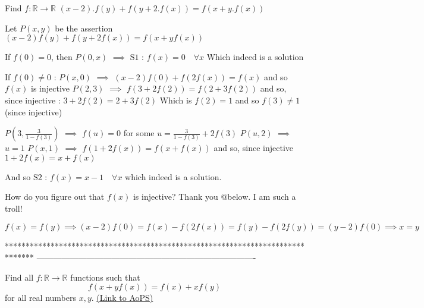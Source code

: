 \begin{solution}
	\begin{tcolorbox}Find $f:\mathbb{R}\to \mathbb{R}$
 $(x-2).f(y)+f(y+2.f(x))=f(x+y.f(x))$\end{tcolorbox}
Let $P(x,y)$ be the assertion $(x-2)f(y)+f(y+2f(x))=f(x+yf(x))$

If $f(0)=0$, then $P(0,x)$ $\implies$ $\boxed{\text{S1 : }f(x)=0\quad\forall x}$
Which indeed is a solution

If $f(0)\ne 0$ :
$P(x,0)$ $\implies$ $(x-2)f(0)+f(2f(x))=f(x)$ and so $f(x)$ is injective
$P(2,3)$ $\implies$ $f(3+2f(2))=f(2+3f(2))$ and so, since injective :  $3+2f(2)=2+3f(2)$
Which is $f(2)=1$ and so $f(3)\ne 1$ (since injective) 

$P(3,\frac 3{1-f(3)})$ $\implies$ $f(u)=0$ for some $u=\frac 3{1-f(3)}+2f(3)$
$P(u,2)$ $\implies$ $u=1$
$P(x,1)$ $\implies$ $f(1+2f(x))=f(x+f(x))$ and so, since injective $1+2f(x)=x+f(x)$

And so $\boxed{\text{S2 : }f(x)=x-1\quad\forall x}$ which indeed is a solution.


\end{solution}



\begin{solution}
	How do you figure out that $f(x)$ is injective?
Thank you @below. I am such a troll!
\end{solution}



\begin{solution}
	$f(x) = f(y) \implies (x-2)f(0) = f(x) - f(2f(x)) = f(y) - f(2f(y)) = (y-2)f(0) \implies x = y$

\end{solution}
*******************************************************************************
-------------------------------------------------------------------------------

\begin{problem}
	Find all $f:\mathbb{R}\to\mathbb{R}$ functions such that 
$$f(x+yf(x))=f(x)+xf(y)$$ for all real numbers $x,y.$
	\flushright \href{https://artofproblemsolving.com/community/c6h1614049}{(Link to AoPS)}
\end{problem}



